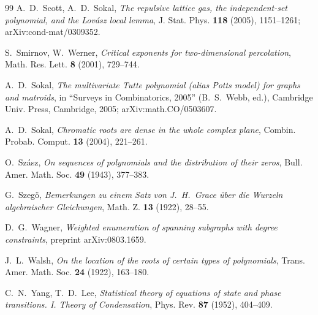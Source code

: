 \documentclass[10pt,reqno]{amsart}
\theoremstyle{plain}
\theoremstyle{definition}
\theoremstyle{remark}
\numberwithin{equation}{section}
\begin{document}
\begin{thebibliography}{99}
A.~D.~Scott, A.~D.~Sokal, {\em The repulsive lattice gas, the independent-set 
polynomial, and the Lov\'asz local lemma}, J. Stat. Phys. {\bf 118} (2005), 
1151--1261; arXiv:cond-mat/0309352.

S.~Smirnov, W.~Werner, {\em Critical exponents for two-dimensional 
percolation}, Math. Res. Lett. {\bf 8} (2001), 729--744. 

A.~D.~Sokal, {\em The multivariate Tutte polynomial (alias Potts model)
for graphs and matroids}, in ``Surveys in Combinatorics, 2005'' 
(B.~S.~Webb, ed.), Cambridge Univ. Press, Cambridge, 2005; 
arXiv:math.CO/0503607.

A.~D.~Sokal, {\em Chromatic roots are dense in the whole complex plane}, 
Combin. Probab. Comput. {\bf 13} (2004), 221--261.

O.~Sz\'asz,
{\em On sequences of polynomials and the distribution of their zeros},
Bull. Amer. Math. Soc. {\bf 49} (1943), 377--383.

G.~Szeg\"o, {\em Bemerkungen zu einem Satz von J.~H.~Grace \"uber die Wurzeln 
algebraischer Gleichungen}, Math. Z. {\bf 13} (1922), 28--55.



D.~G.~Wagner, {\em  Weighted enumeration of spanning subgraphs with degree 
constraints}, preprint arXiv:0803.1659.

J.~L.~Walsh, {\em On the location of the roots of certain types of 
polynomials}, Trans. Amer. Math. Soc. {\bf 24} (1922), 163--180.

C.~N.~Yang, T.~D.~Lee, {\em Statistical theory of equations of 
state and phase transitions. I. Theory of Condensation}, Phys. Rev. {\bf 87} 
(1952), 404--409.

\end{thebibliography}
\end{document}
